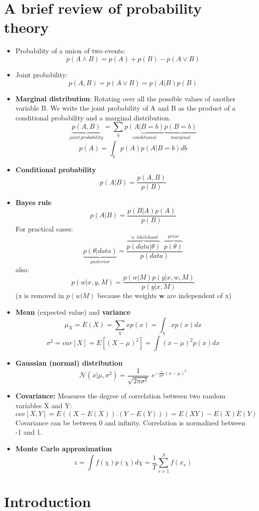 \documentclass[a4paper,11pt]{article}
\begin{document}
	\section{A brief review of probability theory}
	\begin{itemize}
		\item Probability of a union of two events:
		\[
		p(A \wedge B) = p(A) + p(B) - p(A \vee B)
		\]
		\item Joint probability:
		\[
		p(A,B) = p(A \vee B) = p(A | B)p(B)
		\]
		\item \textbf{Marginal distribution}: Rotating over all the possible values of another variable B. We write the joint probability of A and B as the product of a conditional probability and a marginal distribution.
		\[
		\underbrace{p(A,B)}_{joint\, probability} = \sum_{b} \underbrace{p(A | B=b)}_{conditional}\underbrace{p(B=b)}_{marginal}
		\]
		\[
		p(A)=\int_b p(A)p(A|B=b)db
		\]
		\item \textbf{Conditional probability}
		\[
		p(A|B) = \frac{p(A,B)}{p(B)}
		\]
		\item \textbf{Bayes rule}
		\[
		p(A|B) = \frac{p(B|A)p(A)}{p(B)}
		\]
		For practical cases:
		\[
		\underbrace{p(\theta|data)}_{posterior} = \frac{\overbrace{p(data|\theta)}^{\propto\,likelihood}\,\,\,\overbrace{p(\theta)}^{prior}}{p(data)}
		\]
		also:
		\[
		p(w|x,y,M) = \frac{p(w|M) p(y|x,w,M)}{p(y|x,M)}
		\]
		(x is removed in $p(w|M)$ because the weights $\mathbf{w}$ are independent of x)
		\item \textbf{Mean} (expected value) and \textbf{variance}
		\[
		\mu_X = E(X)=\sum_{\chi} x p(x) = \int_{\chi} x p(x)dx
		\]
		\[
		\sigma^2= var[X] = E[(X-\mu)^2]=\int (x-\mu)^2 p(x)dx
		\]
		\item \textbf{Gaussian (normal) distribution}
		\[
		\mathcal{N}(x|\mu, \sigma^2) = \frac{1}{\sqrt{2\pi\sigma^2}}\,\, e^{-\frac{1}{2\sigma^2} (x-\mu)^2}
		\]
		\item \textbf{Covariance:} Measures the degree of correlation between two random variables X and Y:
		\[
		cov[X,Y] = E((X-E(X)).(Y-E(Y))) = E(XY)-E(X)E(Y)
		\]
		Covariance can be between 0 and infinity. Correlation is normalized between -1 and 1.
		\item \textbf{Monte Carlo approximation}
		\[
		z = \int f(\chi)p(\chi)d\chi = \frac{1}{T} \sum_{s=1}^{S} f(x_s)	
		\]
	\end{itemize}
	\section{Introduction}
\end{document}
